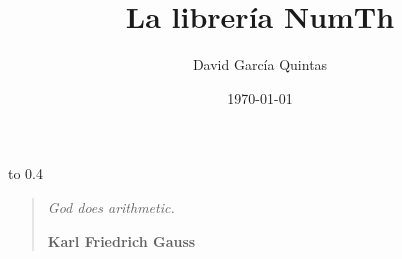 \documentclass[a4paper,twoside,spanish,12pt]{report}
\author{David García Quintas}
\title{La librería NumTh}
\date{\today}
\theoremstyle{break}
\theoremstyle{change}
\theoremstyle{nonumberplain}
\begin{document}
\renewcommand{\tablename}{Tabla}
\maketitle

%
%



\newpage

\vbox to 0.4\textheight{}
\begin{flushright}
  \begin{minipage}[t]{8cm}
    \begin{flushright}
      \begin{quote}
        \emph{
        God does arithmetic.
        }
        \begin{flushright}
          \textbf{\textemdash Karl Friedrich Gauss}
        \end{flushright}
      \end{quote}
    \end{flushright}
  \end{minipage}
\end{flushright}
\vfill

\newpage


\tableofcontents
\listoffigures
\listofalgorithms




%
%
%
%
%
%

%
%





\printindex
\end{document}
